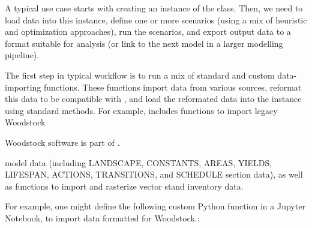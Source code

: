 \documentclass[letterpaper,10pt,english]{sphinxmanual}
\begin{document}
A typical use case starts with creating an instance of the  class. Then, we need to load data into this instance, define one or more scenarios (using a mix of heuristic and optimization approaches), run the scenarios, and export output data to a format suitable for analysis (or link to the next model in a larger modelling pipeline).

The first step in typical workflow is to run a mix of standard  and custom data-importing functions.  These functions import data from various sources,  reformat this data to be compatible with , and load the reformated data into the  instance using standard methods. For example,  includes functions to import legacy Woodstock %
\begin{footnote}[1]\sphinxAtStartFootnote
Woodstock software is part of .
%
\end{footnote} model data (including LANDSCAPE, CONSTANTS, AREAS, YIELDS, LIFESPAN, ACTIONS, TRANSITIONS, and SCHEDULE section data), as well as functions to import and rasterize vector stand inventory data.

For example, one might define the following custom Python function in a Jupyter Notebook, to import data formatted for Woodstock.:

\begin{sphinxVerbatim}[commandchars=\\\{\}]
   
                              
      
     
\end{sphinxVerbatim}
\end{document}
